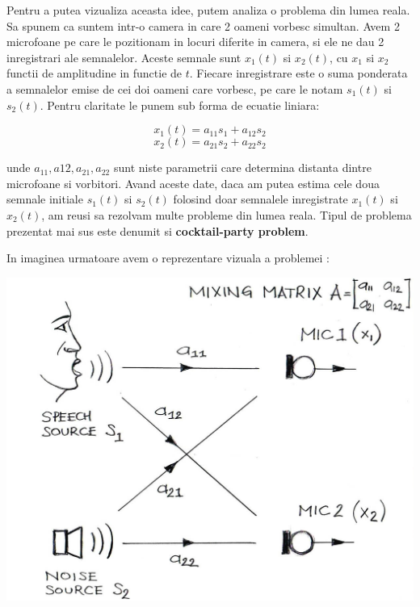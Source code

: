 \documentclass[12pt,oneside]{article}
\begin{document}
Pentru a putea vizualiza aceasta idee, putem analiza o problema din lumea reala. Sa spunem ca suntem intr-o camera in care 2 oameni vorbesc simultan. Avem 2 microfoane pe care le pozitionam in locuri diferite in camera, si ele ne dau 2 inregistrari ale semnalelor. Aceste semnale sunt $x_1 (t)$ si $x_2 (t)$, cu $x_1$ si $x_2$ functii de amplitudine in functie de $t$. Fiecare inregistrare este o suma ponderata a semnalelor emise de cei doi oameni care vorbesc, pe care le notam $s_1(t)$ si $s_2(t)$. Pentru claritate le punem sub forma de ecuatie liniara:

\begin{equation}
	x_1(t)=a_{11} s_1 + a_{12} s_2
\end{equation}
\begin{equation}
	x_2(t)=a_{21} s_2 + a_{22} s_2
\end{equation}

unde $a_{11}, a{12}, a_{21}, a_{22}$ sunt niste parametrii care determina distanta dintre microfoane si vorbitori. Avand aceste date, daca am putea estima cele doua semnale initiale $s_1(t)$ si $s_2(t)$ folosind doar semnalele inregistrate $x_1(t)$ si $x_2(t)$, am reusi sa rezolvam multe probleme din lumea reala. Tipul de problema prezentat mai sus este denumit si \textbf{cocktail-party problem}.

In imaginea urmatoare avem o reprezentare vizuala a problemei \cite{noise_reduction}:

\begin{center}
	\includegraphics[scale=0.4]{two-sound-sources}
\end{center}
\end{document}
